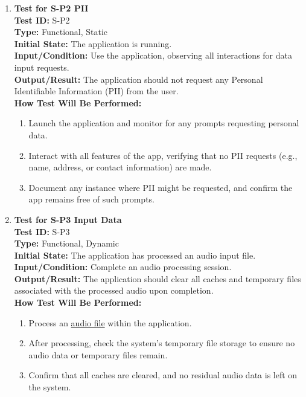 \documentclass[12pt, titlepage]{article}
\begin{document}
\begin{enumerate}
    \item \textbf{Test for S-P2 PII} \\
      \newline
      \textbf{Test ID:} S-P2 \\
      \textbf{Type:} Functional, Static \\
      \textbf{Initial State:} The application is running. \\
      \textbf{Input/Condition:} Use the application, observing all interactions for data input requests. \\
      \textbf{Output/Result:} The application should not request any Personal Identifiable Information (PII) from the user. \\
      \textbf{How Test Will Be Performed:}
      \begin{enumerate}
          \item Launch the application and monitor for any prompts requesting personal data.
          \item Interact with all features of the app, verifying that no PII requests (e.g., name, address, or contact information) are made.
          \item Document any instance where PII might be requested, and confirm the app remains free of such prompts.
      \end{enumerate}

    \item \textbf{Test for S-P3 Input Data} \\
      \newline
      \textbf{Test ID:} S-P3 \\
      \textbf{Type:} Functional, Dynamic \\
      \textbf{Initial State:} The application has processed an audio input file. \\
      \textbf{Input/Condition:} Complete an audio processing session. \\
      \textbf{Output/Result:} The application should clear all caches and temporary files associated with the processed audio upon completion. \\
      \textbf{How Test Will Be Performed:}
      \begin{enumerate}
          \item Process an \href{https://github.com/JaakLipp/ScoreGen/tree/main/test/TestingDatasets/piano-samples}{audio file} within the application.
          \item After processing, check the system’s temporary file storage to ensure no audio data or temporary files remain.
          \item Confirm that all caches are cleared, and no residual audio data is left on the system.
      \end{enumerate}
\end{enumerate}
\end{document}
